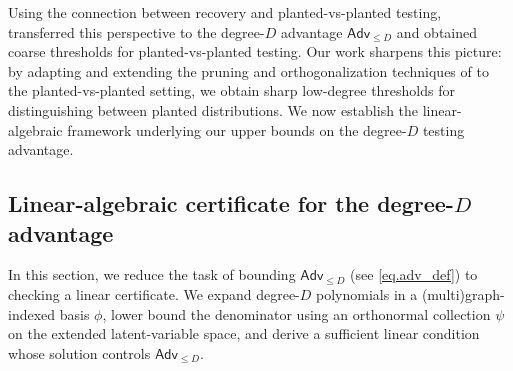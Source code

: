 \documentclass[11pt, letterpaper]{article}
\numberwithin{equation}{section}
\newcommand{\Adv}{\mathsf{Adv}}
\begin{document}
Using the connection between recovery and planted-vs-planted testing,
\cite{rush2023easier} transferred this perspective to the degree-$D$ advantage
$\Adv_{\leq D}$ and obtained coarse thresholds for planted-vs-planted testing. Our work sharpens this picture: by adapting and extending the pruning and orthogonalization techniques of \cite{sohn2025sharp} to the planted-vs-planted
setting, we obtain sharp low-degree thresholds for distinguishing between planted distributions. We now establish the linear-algebraic framework underlying our upper bounds on the degree-$D$ testing advantage.
\subsection{Linear-algebraic certificate for the degree-$D$ advantage}\label{subsec:u-certificate-general}
In this section, we reduce the task of bounding $\Adv_{\le D}$ (see \eqref{eq.adv_def}) to checking a linear certificate. We expand degree-$D$ polynomials in a (multi)graph-indexed basis $\phi$, lower bound the denominator using an orthonormal collection $\psi$ on the extended latent-variable space,  and derive a sufficient linear condition whose solution controls $\Adv_{\le D}$.
\end{document}
